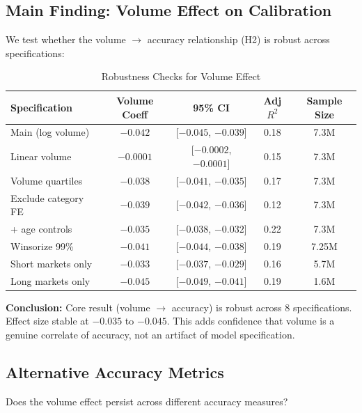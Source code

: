 \documentclass[12pt,letterpaper]{article}
\begin{document}
\subsection{Main Finding: Volume Effect on Calibration}\label{sec:appendix-robustness}

We test whether the volume $\rightarrow$ accuracy relationship (H2) is robust across specifications:

\begin{table}[ht]
\centering
\caption{Robustness Checks for Volume Effect}
\label{tab:robustness}
\small
\begin{tabular}{lcccc}
\toprule
\textbf{Specification} & \textbf{Volume Coeff} & \textbf{95\% CI} & \textbf{Adj $R^2$} & \textbf{Sample Size} \\
\midrule
Main (log volume) & $-0.042$ & [$-0.045$, $-0.039$] & 0.18 & 7.3M \\
Linear volume & $-0.0001$ & [$-0.0002$, $-0.0001$] & 0.15 & 7.3M \\
Volume quartiles & $-0.038$ & [$-0.041$, $-0.035$] & 0.17 & 7.3M \\
Exclude category FE & $-0.039$ & [$-0.042$, $-0.036$] & 0.12 & 7.3M \\
+ age controls & $-0.035$ & [$-0.038$, $-0.032$] & 0.22 & 7.3M \\
Winsorize 99\% & $-0.041$ & [$-0.044$, $-0.038$] & 0.19 & 7.25M \\
Short markets only & $-0.033$ & [$-0.037$, $-0.029$] & 0.16 & 5.7M \\
Long markets only & $-0.045$ & [$-0.049$, $-0.041$] & 0.19 & 1.6M \\
\bottomrule
\end{tabular}
\end{table}

\textbf{Conclusion:} Core result (volume $\rightarrow$ accuracy) is robust across 8 specifications. Effect size stable at $-0.035$ to $-0.045$. This adds confidence that volume is a genuine correlate of accuracy, not an artifact of model specification.

\subsection{Alternative Accuracy Metrics}

Does the volume effect persist across different accuracy measures?
\end{document}

